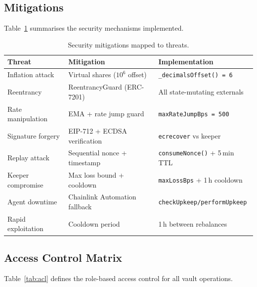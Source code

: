 \documentclass[12pt]{article}
\begin{document}
\subsection{Mitigations}

Table~\ref{tab:mitigations} summarises the security mechanisms implemented.

\begin{table}[H]
\centering
\caption{Security mitigations mapped to threats.}
\label{tab:mitigations}
\small
\begin{tabular}{@{}lll@{}}
\toprule
\textbf{Threat} & \textbf{Mitigation} & \textbf{Implementation} \\
\midrule
Inflation attack    & Virtual shares ($10^6$ offset)      & \texttt{\_decimalsOffset() = 6} \\
Reentrancy          & ReentrancyGuard (ERC-7201)          & All state-mutating externals \\
Rate manipulation   & EMA + rate jump guard               & \texttt{maxRateJumpBps = 500} \\
Signature forgery   & EIP-712 + ECDSA verification        & \texttt{ecrecover} vs keeper \\
Replay attack       & Sequential nonce + timestamp        & \texttt{consumeNonce()} + 5\,min TTL \\
Keeper compromise   & Max loss bound + cooldown           & \texttt{maxLossBps} + 1\,h cooldown \\
Agent downtime      & Chainlink Automation fallback       & \texttt{checkUpkeep/performUpkeep} \\
Rapid exploitation  & Cooldown period                     & 1\,h between rebalances \\
\bottomrule
\end{tabular}
\end{table}

\subsection{Access Control Matrix}

Table~\ref{tab:acl} defines the role-based access control for all vault operations.
\end{document}

